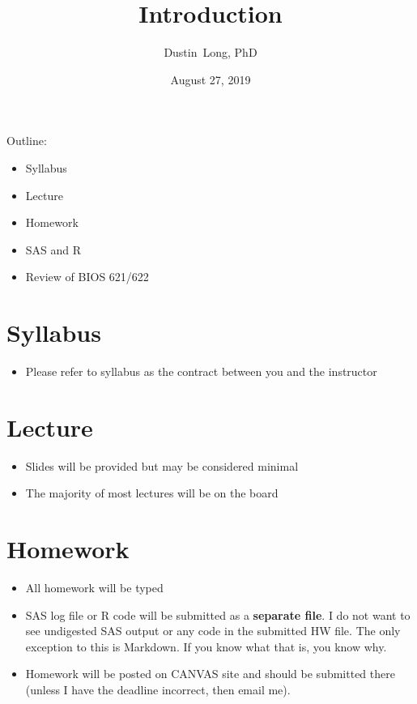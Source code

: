 \documentclass[handout,x11names,unknownkeysallowed]{beamer}
\title[] %
{Introduction}
\author[Dustin Long, PhD] %
{Dustin~Long, PhD}
\institute[UAB]
{
  Department of Biostatistics\\
	University of Alabama at Birmingham

}
\date[Introduction]{August 27, 2019}
\makeatletter
\newcommand{\beamitem}{\begin{itemize}[<+-|alert@+>]}
\makeatother
\begin{document}
\begin{frame}
  \titlepage
\end{frame}

\begin{frame}
Outline:
\begin{itemize}
\item Syllabus
\item Lecture
\item Homework
\item SAS and R
\item Review of BIOS 621/622
\end{itemize}

\end{frame}


\section{Syllabus}
\begin{frame}
\beamitem
\item Please refer to syllabus as the contract between you and the instructor
\end{itemize}
\end{frame}

\section{Lecture}
\begin{frame}
\beamitem
\item Slides will be provided but may be considered minimal
\item The majority of most lectures will be on the board 
\end{itemize}
\end{frame}


\section{Homework}
\begin{frame}
\beamitem
\item All homework will be typed
\item SAS log file or R code will be submitted as a \textbf{separate file}.  I do not want to see undigested SAS output or any code in the submitted HW file.  The only exception to this is Markdown.  If you know what that is, you know why. 
\item Homework will be posted on CANVAS site and should be submitted there (unless I have the deadline incorrect, then email me).
\end{itemize}
\end{frame}
\end{document}
